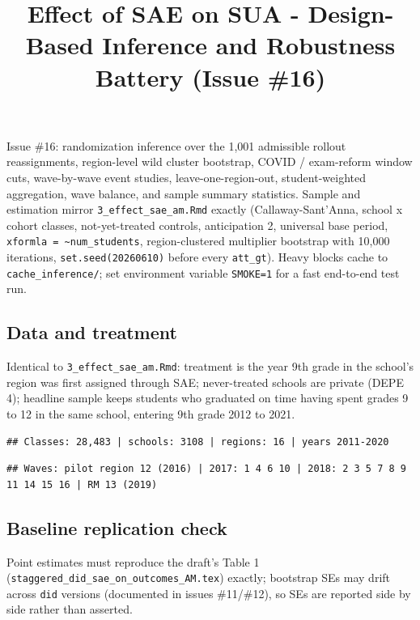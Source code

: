 \documentclass[
]{article}
\title{Effect of SAE on SUA - Design-Based Inference and Robustness
Battery (Issue \#16)}
\author{}
\date{\vspace{-2.5em}}
\begin{document}
\maketitle

Issue \#16: randomization inference over the 1,001 admissible rollout
reassignments, region-level wild cluster bootstrap, COVID / exam-reform
window cuts, wave-by-wave event studies, leave-one-region-out,
student-weighted aggregation, wave balance, and sample summary
statistics. Sample and estimation mirror \texttt{3\_effect\_sae\_am.Rmd}
exactly (Callaway-Sant'Anna, school x cohort classes, not-yet-treated
controls, anticipation 2, universal base period,
\texttt{xformla\ =\ \textasciitilde{}num\_students}, region-clustered
multiplier bootstrap with 10,000 iterations, \texttt{set.seed(20260610)}
before every \texttt{att\_gt}). Heavy blocks cache to
\texttt{cache\_inference/}; set environment variable \texttt{SMOKE=1}
for a fast end-to-end test run.

\hypertarget{data-and-treatment}{%
\subsection{Data and treatment}\label{data-and-treatment}}

Identical to \texttt{3\_effect\_sae\_am.Rmd}: treatment is the year 9th
grade in the school's region was first assigned through SAE;
never-treated schools are private (DEPE 4); headline sample keeps
students who graduated on time having spent grades 9 to 12 in the same
school, entering 9th grade 2012 to 2021.

\begin{verbatim}
## Classes: 28,483 | schools: 3108 | regions: 16 | years 2011-2020
\end{verbatim}

\begin{verbatim}
## Waves: pilot region 12 (2016) | 2017: 1 4 6 10 | 2018: 2 3 5 7 8 9 11 14 15 16 | RM 13 (2019)
\end{verbatim}

\hypertarget{baseline-replication-check}{%
\subsection{Baseline replication
check}\label{baseline-replication-check}}

Point estimates must reproduce the draft's Table 1
(\texttt{staggered\_did\_sae\_on\_outcomes\_AM.tex}) exactly; bootstrap
SEs may drift across \texttt{did} versions (documented in issues
\#11/\#12), so SEs are reported side by side rather than asserted.
\end{document}
